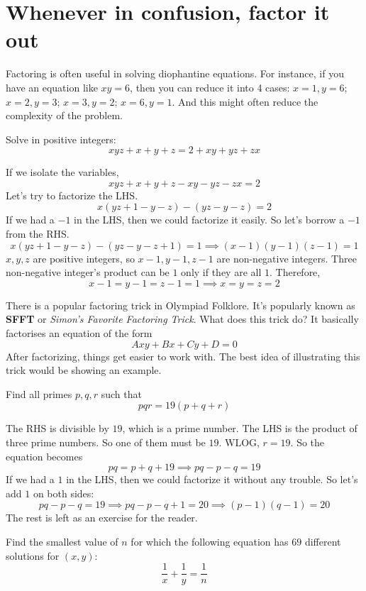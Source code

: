 \documentclass[11pt]{scrartcl}
\begin{document}
\section{Whenever in confusion, factor it out}
Factoring is often useful in solving diophantine equations. For instance, if you have an equation like \(xy = 6\), then you can reduce it into 4 cases: \(x=1, y=6\); \(x=2, y=3\); \(x=3, y=2\); \(x=6, y=1\). And this might often reduce the complexity of the problem.
\begin{exercise}
Solve in positive integers:
\[xyz+x+y+z = 2 + xy+yz+zx\]
\end{exercise}
\begin{soln}
If we isolate the variables,
\[xyz+x+y+z -xy -yz -zx= 2\]
Let's try to factorize the LHS.
\[x(yz+1 -y - z) - (yz -y - z) = 2\]
If we had a \(-1\) in the LHS, then we could factorize it easily. So let's borrow a \(-1\) from the RHS.
\[x(yz+1 -y - z) - (yz -y - z +1) = 1 \implies (x-1)(y-1)(z-1)=1\]
\(x,y,z\) are positive integers, so \(x-1, y-1, z-1\) are non-negative integers. Three non-negative integer's product can be \(1\) only if they are all \(1\). Therefore,
\[x-1 = y-1 = z-1 =1 \implies \boxed{x=y=z=2}\]
\end{soln}
There is a popular factoring trick in Olympiad Folklore. It's popularly known as \textbf{SFFT} or \textit{Simon's Favorite Factoring Trick}. What does this trick do? It basically factorises an equation of the form \[Axy + Bx + Cy + D =0\]
After factorizing, things get easier to work with. The best idea of illustrating this trick would be showing an example. 
\begin{exercise}
Find all primes \(p,q,r\) such that
\[pqr = 19(p+q+r)\]
\end{exercise}
\begin{soln}
The RHS is divisible by \(19\), which is a prime number. The LHS is the product of three prime numbers. So one of them must be \(19\). WLOG, \(r = 19\). So the equation becomes
\[pq = p+q+19 \implies pq-p-q=19\]
If we had a \(1\) in the LHS, then we could factorize it without any trouble. So let's add \(1\) on both sides:
\[pq-p-q = 19 \implies pq-p-q+1=20 \implies (p-1)(q-1)=20\]
The rest is left as an exercise for the reader.
\end{soln}
\begin{exercise}
Find the smallest value of \(n\) for which the following equation has \(69\) different solutions for \((x,y)\):
\[\frac1x + \frac1y = \frac1n\]
\end{exercise}
\end{document}
